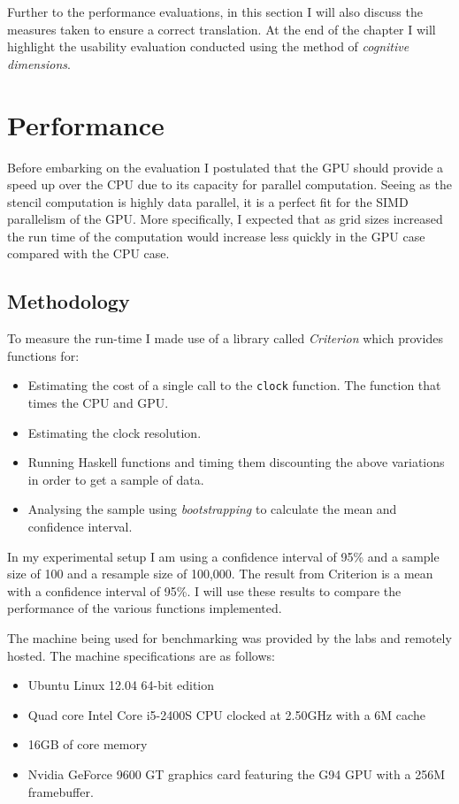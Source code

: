 \documentclass[12pt,a4paper,twoside]{scrbook}
\begin{document}
Further to the performance evaluations, in this section I will also discuss the
measures taken to ensure a correct translation. At the end of the chapter I will
highlight the usability evaluation conducted using the method of \emph{cognitive
  dimensions}.

\section{Performance}

Before embarking on the evaluation I postulated that the GPU should
provide a speed up over the CPU due to its capacity for parallel
computation. Seeing as the stencil computation is highly data parallel,
it is a perfect fit for the SIMD parallelism of the GPU. More
specifically, I expected that as grid sizes increased the run time of
the computation would increase less quickly in the GPU case compared
with the CPU case.

\subsection{Methodology}

To measure the run-time I made use of a library called \emph{Criterion}
which provides functions for:

\begin{itemize}
\itemsep1pt\parskip0pt
\item
  Estimating the cost of a single call to the \texttt{clock} function.
  The function that times the CPU and GPU.
\item
  Estimating the clock resolution.
\item
  Running Haskell functions and timing them discounting the above
  variations in order to get a sample of data.
\item
  Analysing the sample using \emph{bootstrapping}\cite{} to calculate the
  mean and confidence interval.
\end{itemize}

In my experimental setup I am using a confidence interval of 95\% and a
sample size of 100 and a resample size of 100,000. The result from
Criterion is a mean with a confidence interval of 95\%. I will use these
results to compare the performance of the various functions implemented.

The machine being used for benchmarking was provided by the labs and
remotely hosted. The machine specifications are as follows:

\begin{itemize}
\itemsep1pt\parskip0pt
\item
  Ubuntu Linux 12.04 64-bit edition
\item
  Quad core Intel Core i5-2400S CPU clocked at 2.50GHz with a 6M cache
\item
  16GB of core memory
\item
  Nvidia GeForce 9600 GT graphics card featuring the G94 GPU with a 256M
  framebuffer.
\end{itemize}
\end{document}
